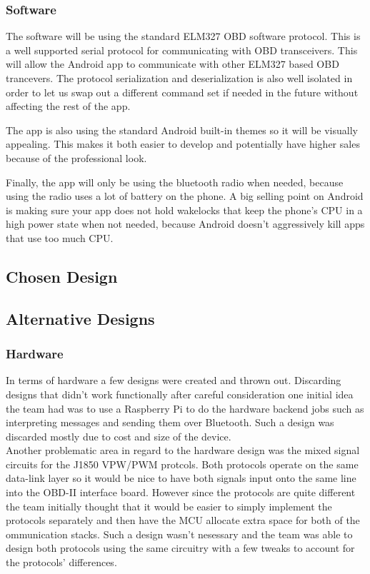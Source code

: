 \documentclass[12pt,letterpaper]{article}
\begin{document}
\subsubsection{Software}
The software will be using the standard ELM327 OBD software protocol. This is a well supported serial protocol for communicating with OBD transceivers. This will allow the Android app to communicate with other ELM327 based OBD trancevers. The protocol serialization and deserialization is also well isolated in order to let us swap out a different command set if needed in the future without affecting the rest of the app. 

The app is also using the standard Android built-in themes so it will be visually appealing. This makes it both easier to develop and potentially have higher sales because of the professional look. 

Finally, the app will only be using the bluetooth radio when needed, because using the radio uses a lot of battery on the phone. A big selling point on Android is making sure your app does not hold wakelocks that keep the phone's CPU in a high power state when not needed, because Android doesn't aggressively kill apps that use too much CPU.
\subsection{Chosen Design}

\subsection{Alternative Designs}
\subsubsection{Hardware}
In terms of hardware a few designs were created and thrown out. Discarding designs that didn't work functionally after careful consideration one initial idea the team had was to use a Raspberry Pi to do the hardware backend jobs such as interpreting messages and sending them over Bluetooth. Such a design was discarded mostly due to cost and size of the device.\\ 

Another problematic area in regard to the hardware design was the mixed signal circuits for the J1850 VPW/PWM protcols. Both protocols operate on the same data-link layer so it would be nice to have both signals input onto the same line into the OBD-II interface board. However since the protocols are quite different the team initially thought that it would be easier to simply implement the protocols separately and then have the MCU allocate extra space for both of the ommunication stacks. Such a design wasn't nesessary and the team was able to design both protocols using the same circuitry with a few tweaks to account for the protocols' differences.
\end{document}
